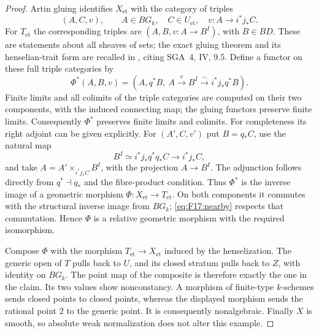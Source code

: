 \begin{proof}
Artin gluing identifies $X_{\mathrm{et}}$ with the category of
triples
\[
 (A,C,v),\qquad A\in BG_k,\quad C\in U_{\mathrm{et}},
 \quad v:A\longrightarrow i^*j_*C.
\]
For $T_{\mathrm{et}}$ the corresponding triples are
$(A,B,v:A\to B^I)$, with $B\in BD$. These are statements about
all sheaves of sets; the exact gluing theorem and its
henselian-trait form are recalled in
\citet[pp.~1--2]{F_Cornut2024}, citing SGA~4, IV, 9.5.
Define a functor on these full triple categories by
\[
 \Phi^*(A,B,v)=
 (A,q^*B,\ A\xrightarrow{v}B^I
                  \xrightarrow{\sim}i^*j_*q^*B).
\]
Finite limits and all colimits of the triple categories are
computed on their two components, with the induced connecting
map; the gluing functors preserve finite limits. Consequently
$\Phi^*$ preserves finite limits and colimits. For completeness
its right adjoint can be given explicitly. For $(A',C,v')$ put
$B=q_*C$, use the natural map
\[
 B^I\simeq i^*j_*q^*q_*C\longrightarrow i^*j_*C,
\]
and take $A=A'\times_{i^*j_*C}B^I$, with the projection
$A\to B^I$. The adjunction follows directly from
$q^*\dashv q_*$ and the fibre-product condition. Thus $\Phi^*$
is the inverse image of a geometric morphism
$\Phi:X_{\mathrm{et}}\to T_{\mathrm{et}}$. On both components
it commutes with the structural inverse image from $BG_k$;
\eqref{eq:F17:nearby} respects that commutation. Hence $\Phi$
is a relative geometric morphism with the required isomorphism.

Compose $\Phi$ with the morphism $T_{\mathrm{et}}\to
X_{\mathrm{et}}$ induced by the henselization. The generic open
of $T$ pulls back to $U$, and its closed stratum pulls back to
$Z$, with identity on $BG_k$. The point map of the composite is
therefore exactly the one in the claim. Its two values show
nonconstancy. A morphism of finite-type $k$-schemes sends closed
points to closed points, whereas the displayed morphism sends
the rational point $2$ to the generic point. It is consequently
nonalgebraic. Finally $X$ is smooth, so absolute weak
normalization does not alter this example.
\end{proof}


